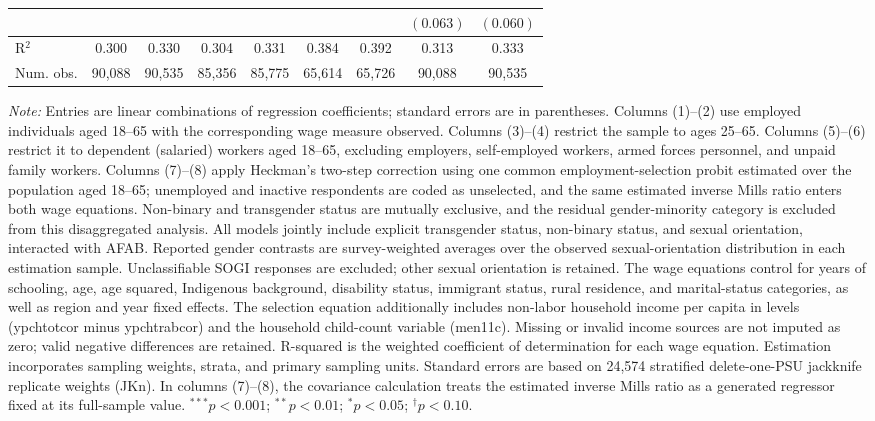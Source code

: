 \begin{table}[htpb]
{\begin{tabular}{l c c c c c c c c}
 &  &  &  &  &  &  & $(0.063)$ & $(0.060)$ \\
\hline
R$^2$ & 0.300 & 0.330 & 0.304 & 0.331 & 0.384 & 0.392 & 0.313 & 0.333 \\
Num. obs. & 90,088 & 90,535 & 85,356 & 85,775 & 65,614 & 65,726 & 90,088 & 90,535 \\
\hline
\end{tabular}%
}
\par\smallskip
\begin{minipage}{\textwidth}\footnotesize
\textit{Note:} Entries are linear combinations of regression coefficients; standard errors are in parentheses. Columns (1)--(2) use employed individuals aged 18--65 with the corresponding wage measure observed. Columns (3)--(4) restrict the sample to ages 25--65. Columns (5)--(6) restrict it to dependent (salaried) workers aged 18--65, excluding employers, self-employed workers, armed forces personnel, and unpaid family workers. Columns (7)--(8) apply Heckman's two-step correction using one common employment-selection probit estimated over the population aged 18--65; unemployed and inactive respondents are coded as unselected, and the same estimated inverse Mills ratio enters both wage equations. Non-binary and transgender status are mutually exclusive, and the residual gender-minority category is excluded from this disaggregated analysis. All models jointly include explicit transgender status, non-binary status, and sexual orientation, interacted with AFAB. Reported gender contrasts are survey-weighted averages over the observed sexual-orientation distribution in each estimation sample. Unclassifiable SOGI responses are excluded; other sexual orientation is retained. The wage equations control for years of schooling, age, age squared, Indigenous background, disability status, immigrant status, rural residence, and marital-status categories, as well as region and year fixed effects. The selection equation additionally includes non-labor household income per capita in levels (ypchtotcor minus ypchtrabcor) and the household child-count variable (men11c). Missing or invalid income sources are not imputed as zero; valid negative differences are retained. R-squared is the weighted coefficient of determination for each wage equation. Estimation incorporates sampling weights, strata, and primary sampling units. Standard errors are based on 24,574 stratified delete-one-PSU jackknife replicate weights (JKn). In columns (7)--(8), the covariance calculation treats the estimated inverse Mills ratio as a generated regressor fixed at its full-sample value. $^{***}p<0.001$; $^{**}p<0.01$; $^{*}p<0.05$; $^{\dagger}p<0.10$.
\end{minipage}
\end{table}
